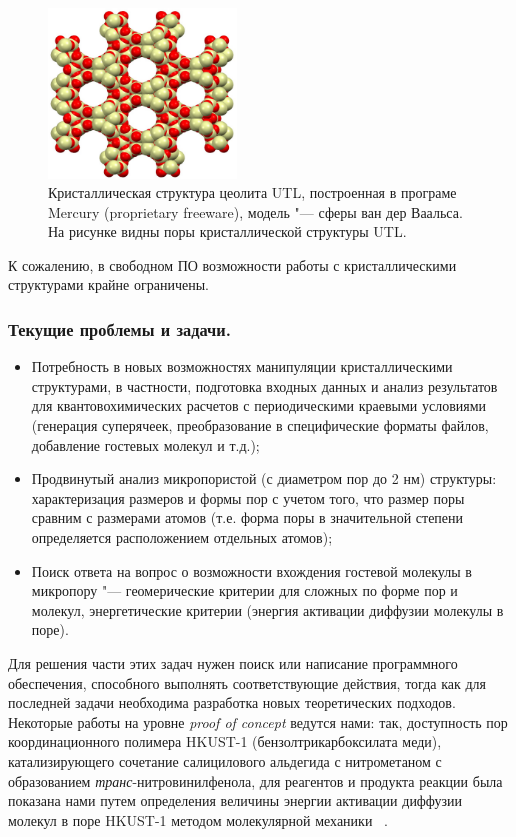 \documentclass[10pt, a5paper]{article}
\begin{document}
\begin{figure}[h!]
  \centering
  \includegraphics[width=5cm]{20_2016_Litvenenka6.png}
  \caption{Кристаллическая структура цеолита UTL, построенная в програме Mercury (proprietary freeware), модель "--- сферы ван дер Ваальса. На рисунке видны поры кристаллической структуры UTL.}
  \label{Litvenenka6}
\end{figure} 
К сожалению, в свободном ПО возможности работы с кристаллическими структурами крайне ограничены.

\subsubsection*{Текущие проблемы и задачи.}

\begin{itemize}
  \item Потребность в новых возможностях манипуляции кристаллическими структурами, в частности, подготовка входных данных и анализ результатов для квантовохимических расчетов с периодическими краевыми условиями (генерация суперячеек, преобразование в специфические форматы файлов, добавление гостевых молекул и т.д.);
  \item Продвинутый анализ микропористой (с диаметром пор до 2 нм) структуры: характеризация размеров и формы пор с учетом того, что размер поры сравним с размерами атомов (т.е. форма поры в значительной степени определяется расположением отдельных атомов);
  \item Поиск ответа на вопрос о возможности вхождения гостевой молекулы в микропору "--- геомерические критерии для сложных по форме пор и молекул, энергетические критерии (энергия активации диффузии молекулы в поре).
\end{itemize}

Для решения части этих задач нужен поиск или написание программного обеспечения, способного выполнять соответствующие \linebreak действия, тогда как для последней задачи необходима разработка новых теоретических подходов. Некоторые работы на уровне \emph{proof of concept} ведутся нами: так, доступность пор координационного полимера HKUST-1 (бензолтрикарбоксилата меди), катализирующего сочетание салицилового альдегида с нитрометаном с образованием \emph{транс}-нитровинилфенола, для реагентов и продукта реакции была показана нами путем определения величины энергии активации диффузии молекул в поре HKUST-1 методом молекулярной механики ~\cite{Litvenenka5}.
\end{document}
